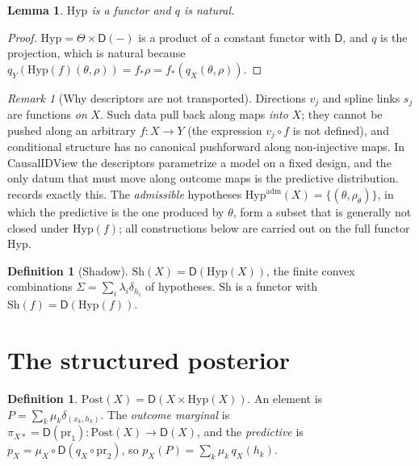 \documentclass[11pt]{article}
\newtheorem{lemma}[theorem]{Lemma}
\theoremstyle{definition}
\newtheorem{definition}[theorem]{Definition}
\theoremstyle{remark}
\newtheorem{remark}[theorem]{Remark}
\newcommand{\D}{\mathsf{D}}
\newcommand{\Hyp}{\mathrm{Hyp}}
\newcommand{\Sh}{\mathrm{Sh}}
\newcommand{\Post}{\mathrm{Post}}
\begin{document}
\begin{lemma}\label{lem:hyp-functor}
$\Hyp$ is a functor and $q$ is natural.
\end{lemma}
\begin{proof}
$\Hyp=\Theta\times\D(-)$ is a product of a constant functor with $\D$, and $q$ is the projection,
which is natural because $q_Y(\Hyp(f)(\theta,\rho))=f_*\rho=f_*(q_X(\theta,\rho))$.
\end{proof}

\begin{remark}[Why descriptors are not transported]\label{rem:variance}
Directions $v_j$ and spline links $s_j$ are functions \emph{on} $X$. Such data pull back along maps
\emph{into} $X$; they cannot be pushed along an arbitrary $f\colon X\to Y$ (the expression $v_j\circ f$
is not defined), and conditional structure has no canonical pushforward along non-injective maps. In
CausalIDView the descriptors parametrize a model on a fixed design, and the only datum that must move
along outcome maps is the predictive distribution.  records exactly this. The
\emph{admissible} hypotheses $\Hyp^{\mathrm{adm}}(X)=\{(\theta,\rho_\theta)\}$, in which the
predictive is the one produced by $\theta$, form a subset that is generally not closed under
$\Hyp(f)$; all constructions below are carried out on the full functor $\Hyp$.
\end{remark}

\begin{definition}[Shadow]
$\Sh(X)=\D(\Hyp(X))$, the finite convex combinations $\Sigma=\sum_i\lambda_i\delta_{h_i}$ of
hypotheses. $\Sh$ is a functor with $\Sh(f)=\D(\Hyp(f))$.
\end{definition}

\section{The structured posterior}\label{sec:post}

\begin{definition}
$\Post(X)=\D(X\times\Hyp(X))$. An element is $P=\sum_k\mu_k\delta_{(x_k,h_k)}$. The \emph{outcome
marginal} is $\pi_{X*}=\D(\mathrm{pr}_1)\colon\Post(X)\to\D(X)$, and the \emph{predictive} is
$p_X=\mu_X\circ\D(q_X\circ\mathrm{pr}_2)$, so $p_X(P)=\sum_k\mu_k\,q_X(h_k)$.
\end{definition}
\end{document}

